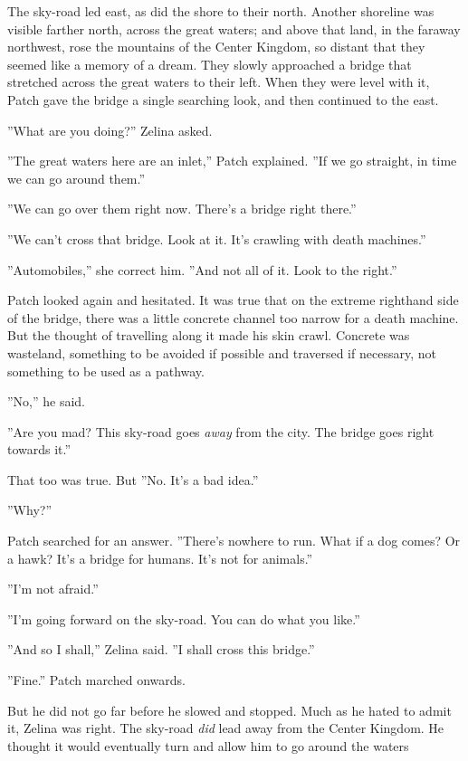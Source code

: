 \documentclass[11pt]{article}
\begin{document}
 The sky-road led east, as did the shore to their north. Another shoreline was visible farther north, across the great waters; and above that land, in the faraway northwest, rose the mountains of the Center Kingdom, so distant that they seemed like a memory of a dream. They slowly approached a bridge that stretched across the great waters to their left. When they were level with it, Patch gave the bridge a single searching look, and then continued to the east.\par
 ''What are you doing?'' Zelina asked.\par
 ''The great waters here are an inlet,'' Patch explained. ''If we go straight, in time we can go around them.''\par
 ''We can go over them right now. There's a bridge right there.''\par
 ''We can't cross that bridge. Look at it. It's crawling with death machines.''\par
 ''Automobiles,'' she correct him. ''And not all of it. Look to the right.''\par
 Patch looked again and hesitated. It was true that on the extreme righthand side of the bridge, there was a little concrete channel too narrow for a death machine. But the thought of travelling along it made his skin crawl. Concrete was wasteland, something to be avoided if possible and traversed if necessary, not something to be used as a pathway.\par
 ''No,'' he said.\par
 ''Are you mad? This sky-road goes {\it away} from the city. The bridge goes right towards it.''\par
 That too was true. But %
 ''No. It's a bad idea.''\par
 ''Why?''\par
 Patch searched for an answer. ''There's nowhere to run. What if a dog comes? Or a hawk? It's a bridge for humans. It's not for animals.''\par
 ''I'm not afraid.''\par
 ''I'm going forward on the sky-road. You can do what you like.''\par
 ''And so I shall,'' Zelina said. ''I shall cross this bridge.''\par
 ''Fine.'' Patch marched onwards.\par
 But he did not go far before he slowed and stopped. Much as he hated to admit it, Zelina was right. The sky-road {\it did} lead away from the Center Kingdom. He thought it would eventually turn and allow him to go around the waters %
\end{document}
